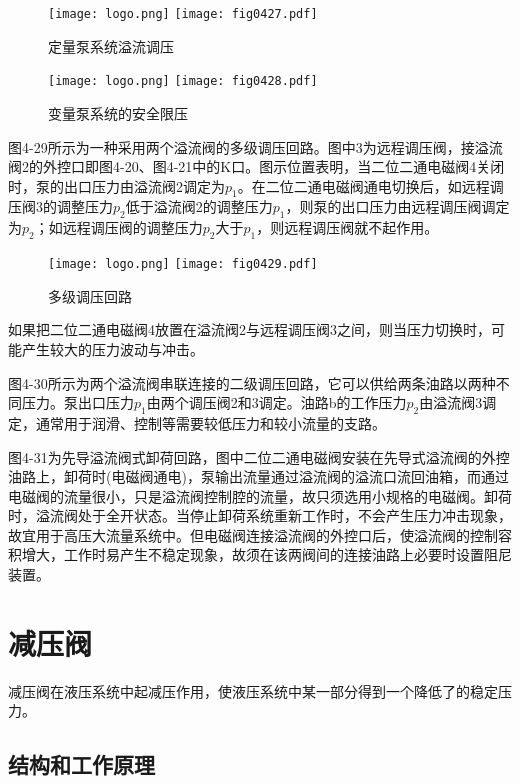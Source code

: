 \begin{figure}[!hbt]
\centering
\ifOpenSource
\texttt{[image: logo.png]}
\else
\texttt{[image: fig0427.pdf]}
\fi
\caption{定量泵系统溢流调压}
\label{fig:fig0427}
\end{figure}
\begin{figure}[!hbt]
\centering
\ifOpenSource
\texttt{[image: logo.png]}
\else
\texttt{[image: fig0428.pdf]}
\fi
\caption{变量泵系统的安全限压}
\label{fig:fig0428}
\end{figure}

图4-29所示为一种采用两个溢流阀的多级调压回路。图中3为远程调压阀，接溢流阀2的外控口即图4-20、图4-21中的K口。图示位置表明，当二位二通电磁阀4关闭时，泵的出口压力由溢流阀2调定为$p_{1}$。在二位二通电磁阀通电切换后，如远程调压阀3的调整压力$p_{2}$低于溢流阀2的调整压力$p_{1}$，则泵的出口压力由远程调压阀调定为$p_{2}$；如远程调压阀的调整压力$p_{2}$大于$p_{1}$，则远程调压阀就不起作用。

\begin{figure}[!hbt]
\centering
\ifOpenSource
\texttt{[image: logo.png]}
\else
\texttt{[image: fig0429.pdf]}
\fi
\caption{多级调压回路}
\label{fig:fig0429}
\end{figure}

如果把二位二通电磁阀4放置在溢流阀2与远程调压阀3之间，则当压力切换时，可能产生较大的压力波动与冲击。

图4-30所示为两个溢流阀串联连接的二级调压回路，它可以供给两条油路以两种不同压力。泵出口压力$p_{1}$由两个调压阀2和3调定。油路b的工作压力$p_{2}$由溢流阀3调定，通常用于润滑、控制等需要较低压力和较小流量的支路。

图4-31为先导溢流阀式卸荷回路，图中二位二通电磁阀安装在先导式溢流阀的外控油路上，卸荷时(电磁阀通电)，泵输出流量通过溢流阀的溢流口流回油箱，而通过电磁阀的流量很小，只是溢流阀控制腔的流量，故只须选用小规格的电磁阀。卸荷时，溢流阀处于全开状态。当停止卸荷系统重新工作时，不会产生压力冲击现象，故宜用于高压大流量系统中。但电磁阀连接溢流阀的外控口后，使溢流阀的控制容积增大，工作时易产生不稳定现象，故须在该两阀间的连接油路上必要时设置阻尼装置。

\section{减压阀}

减压阀在液压系统中起减压作用，使液压系统中某一部分得到一个降低了的稳定压力。

\subsection{结构和工作原理}

